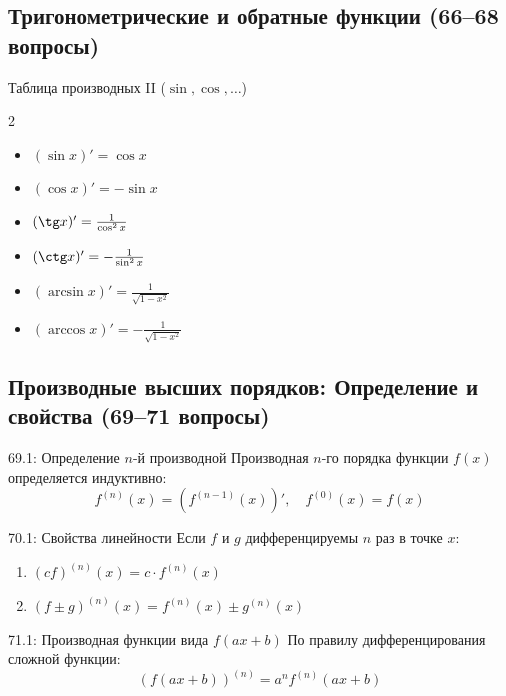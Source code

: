 \documentclass[a4paper,12pt]{article}
\begin{document}
	
	
	
	
	\subsection{Тригонометрические и обратные функции (66--68 вопросы)}
	
	\begin{theorembox}{{Таблица производных II ($\sin, \cos, \dots$)}}
		\begin{multicols}{2}
			\begin{itemize}
				\item $(\sin x)' = \cos x$
				\item $(\cos x)' = -\sin x$
				\item $(\tg x)' = \frac{1}{\cos^2 x}$
				\item $(\ctg x)' = -\frac{1}{\sin^2 x}$
				\item $(\arcsin x)' = \frac{1}{\sqrt{1-x^2}}$
				\item $(\arccos x)' = -\frac{1}{\sqrt{1-x^2}}$
			\end{itemize}
		\end{multicols}
	\end{theorembox}
	
	
	
	
	
	
	\subsection{Производные высших порядков: Определение и свойства (69--71 вопросы)}
	
	\begin{definitionbox}{69.1: Определение $n$-й производной}
		Производная $n$-го порядка функции $f(x)$ определяется индуктивно:
		$$ f^{(n)}(x) = (f^{(n-1)}(x))', \quad f^{(0)}(x) = f(x) $$
	\end{definitionbox}
	
	\begin{theorembox}{70.1: Свойства линейности}
		Если $f$ и $g$ дифференцируемы $n$ раз в точке $x$:
		\begin{enumerate}
			\item $(cf)^{(n)}(x) = c \cdot f^{(n)}(x)$
			\item $(f \pm g)^{(n)}(x) = f^{(n)}(x) \pm g^{(n)}(x)$
		\end{enumerate}
	\end{theorembox}
	
	\begin{theorembox}{71.1: Производная функции вида $f(ax+b)$}
		По правилу дифференцирования сложной функции:
		$$ (f(ax+b))^{(n)} = a^n f^{(n)}(ax+b) $$
	\end{theorembox}
	
\end{document}

